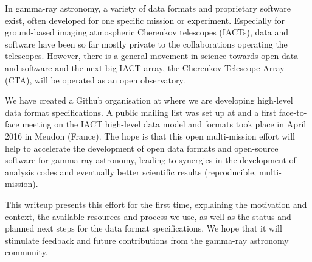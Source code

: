 In gamma-ray astronomy, a variety of data formats and proprietary software exist, often developed for one specific mission or experiment. Especially for ground-based imaging atmospheric Cherenkov telescopes (IACTs), data and software have been so far mostly private to the collaborations operating the telescopes. However, there is a general movement in science towards open data and software and the next big IACT array, the Cherenkov Telescope Array (CTA), will be operated as an open observatory.

We have created a Github organisation at \ogragithub where we are developing high-level data format specifications. A public mailing list was set up at \ogralist and a first face-to-face meeting on the IACT high-level data model and formats took place in April 2016 in Meudon (France). The hope is that this open multi-mission effort will help to accelerate the development of open data formats and open-source software for gamma-ray astronomy, leading to synergies in the development of analysis codes and eventually better scientific results (reproducible, multi-mission).

This writeup presents this effort for the first time, explaining the motivation and context, the available resources and process we use, as well as the status and planned next steps for the data format specifications. We hope that it will stimulate feedback and future contributions from the gamma-ray astronomy community.
